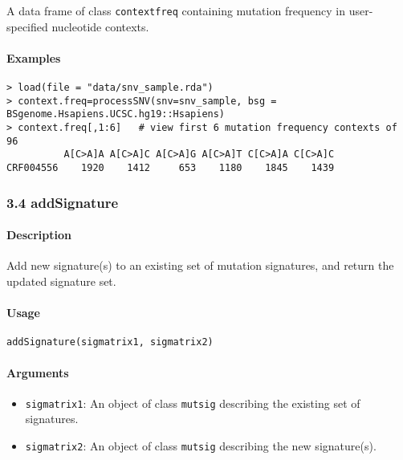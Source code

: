 \documentclass[]{article}
\providecommand{\tightlist}{%
  \setlength{\itemsep}{0pt}\setlength{\parskip}{0pt}}
\let\oldparagraph\paragraph
\renewcommand{\paragraph}[1]{\oldparagraph{#1}\mbox{}}
\begin{document}
A data frame of class \texttt{contextfreq} containing mutation frequency
in user-specified nucleotide contexts.

\paragraph{\texorpdfstring{\textbf{Examples}}{Examples}}\label{examples-2}

\begin{verbatim}
> load(file = "data/snv_sample.rda")
> context.freq=processSNV(snv=snv_sample, bsg = BSgenome.Hsapiens.UCSC.hg19::Hsapiens)
> context.freq[,1:6]   # view first 6 mutation frequency contexts of 96
          A[C>A]A A[C>A]C A[C>A]G A[C>A]T C[C>A]A C[C>A]C
CRF004556    1920    1412     653    1180    1845    1439
\end{verbatim}

\subsubsection{3.4 addSignature}\label{addsignature}

\paragraph{\texorpdfstring{\textbf{Description}}{Description}}\label{description-3}

Add new signature(s) to an existing set of mutation signatures, and
return the updated signature set.

\paragraph{\texorpdfstring{\textbf{Usage}}{Usage}}\label{usage-3}

\texttt{addSignature(sigmatrix1,\ sigmatrix2)}

\paragraph{\texorpdfstring{\textbf{Arguments
}}{Arguments }}\label{mutsig}

\begin{itemize}
\tightlist
\item
  \texttt{sigmatrix1}: An object of class \texttt{mutsig} describing the
  existing set of signatures.
\item
  \texttt{sigmatrix2}: An object of class \texttt{mutsig} describing the
  new signature(s).
\end{itemize}
\end{document}
